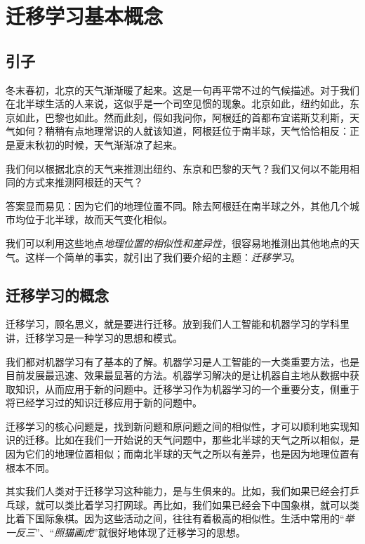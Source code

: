 \newpage


\setcounter{page}{1}

\section{迁移学习基本概念} \label{overview}%

\subsection{引子}

冬末春初，北京的天气渐渐暖了起来。这是一句再平常不过的气候描述。对于我们在北半球生活的人来说，这似乎是一个司空见惯的现象。北京如此，纽约如此，东京如此，巴黎也如此。然而此刻，假如我问你，阿根廷的首都布宜诺斯艾利斯，天气如何？稍稍有点地理常识的人就该知道，阿根廷位于南半球，天气恰恰相反：正是夏末秋初的时候，天气渐渐凉了起来。

我们何以根据北京的天气来推测出纽约、东京和巴黎的天气？我们又何以不能用相同的方式来推测阿根廷的天气？

答案显而易见：因为它们的地理位置不同。除去阿根廷在南半球之外，其他几个城市均位于北半球，故而天气变化相似。

我们可以利用这些地点\textit{地理位置的相似性和差异性}，很容易地推测出其他地点的天气。这样一个简单的事实，就引出了我们要介绍的主题：\textit{迁移学习}。

\subsection{迁移学习的概念}

迁移学习，顾名思义，就是要进行迁移。放到我们人工智能和机器学习的学科里讲，迁移学习是一种学习的思想和模式。

我们都对机器学习有了基本的了解。机器学习是人工智能的一大类重要方法，也是目前发展最迅速、效果最显著的方法。机器学习解决的是让机器自主地从数据中获取知识，从而应用于新的问题中。迁移学习作为机器学习的一个重要分支，侧重于将已经学习过的知识迁移应用于新的问题中。

迁移学习的核心问题是，找到新问题和原问题之间的相似性，才可以顺利地实现知识的迁移。比如在我们一开始说的天气问题中，那些北半球的天气之所以相似，是因为它们的地理位置相似；而南北半球的天气之所以有差异，也是因为地理位置有根本不同。

其实我们人类对于迁移学习这种能力，是与生俱来的。比如，我们如果已经会打乒乓球，就可以类比着学习打网球。再比如，我们如果已经会下中国象棋，就可以类比着下国际象棋。因为这些活动之间，往往有着极高的相似性。生活中常用的“\textit{举一反三}”、“\textit{照猫画虎}”就很好地体现了迁移学习的思想。

